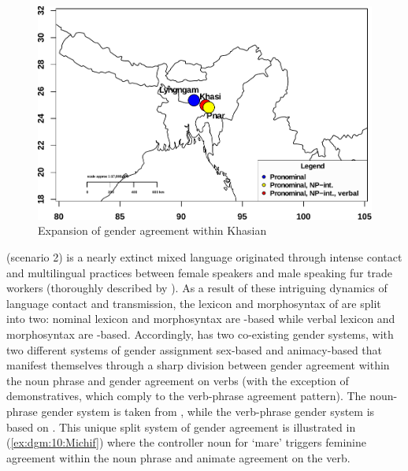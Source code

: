 \documentclass[output=collectionpaper]{langsci/langscibook}
\begin{document}
\begin{figure}
\includegraphics[width=\textwidth]{figures/11/Khasian2a.pdf}
\caption{Expansion of gender agreement within Khasian}
\label{fig:dgm:Khasian1}
\end{figure}


 (scenario 2) is a nearly extinct mixed language originated through intense contact and multilingual practices between female   speakers and male  speaking fur trade workers (thoroughly described by \citealt{Bakker1997}). As a result of these intriguing dynamics of language contact and transmission, the lexicon and morphosyntax of  are split into two: nominal lexicon and morphosyntax are -based while verbal lexicon and morphosyntax are -based. Accordingly,  has two co-existing gender systems, with two different systems of gender assignment \textendash{} sex-based and animacy-based \textendash{} that manifest themselves through a sharp division between gender agreement within the noun phrase and gender agreement on verbs (with the exception of demonstratives, which comply to the verb-phrase agreement pattern). The noun-phrase gender system is taken from , while the verb-phrase gender system is based on . This unique split system of gender agreement is illustrated in (\ref{ex:dgm:10:Michif}) where the controller noun for `mare' triggers feminine agreement within the noun phrase and animate agreement on the verb.
\end{document}
